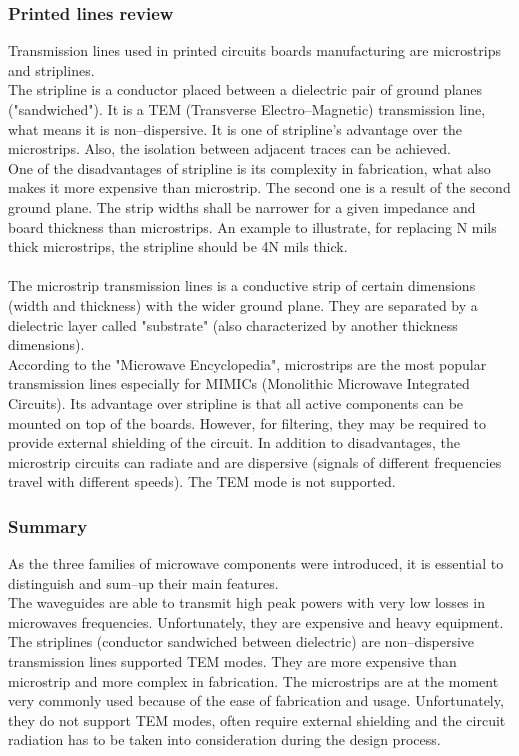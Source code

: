 \documentclass[eng,printmode]{mgr}
\begin{document}
\subsubsection{Printed lines review}
Transmission lines used in printed circuits boards manufacturing are microstrips and striplines.\\
The stripline is a conductor placed between a dielectric pair of ground planes ("sandwiched"). It is a TEM (Transverse Electro--Magnetic) transmission line, what means it is non--dispersive. It is one of stripline's advantage over the microstrips. Also, the isolation between adjacent traces can be achieved.\\
One of the disadvantages of stripline is its complexity in fabrication, what also makes it more expensive than microstrip. The second one is a result of the second ground plane. The strip widths shall be narrower for a given impedance and board thickness than microstrips. 
An example to illustrate, for replacing N mils thick microstrips, the stripline should be 4N mils thick.
\\
\\
The microstrip transmission lines is a conductive strip of certain dimensions (width and thickness) with the wider ground plane. They are separated by a dielectric layer called "substrate" (also characterized by another thickness dimensions). \\According to the "Microwave Encyclopedia", microstrips are the most popular transmission lines especially for MIMICs (Monolithic Microwave Integrated Circuits).
Its advantage over stripline is that all active components can be mounted on top of the boards. However, for filtering, they may be required to provide external shielding of the circuit. In addition to disadvantages, the microstrip circuits can radiate and are dispersive (signals of different frequencies travel with different speeds). The TEM mode is not supported.

\subsubsection{Summary}
As the three families of microwave components were introduced, it is essential to distinguish and sum--up their main features.\\
The waveguides are able to transmit high peak powers with very low losses in microwaves frequencies. Unfortunately, they are expensive and heavy equipment.
The striplines (conductor sandwiched between dielectric) are non--dispersive transmission lines supported TEM modes. They are more expensive than microstrip and more complex in fabrication.
The microstrips are at the moment very commonly used because of the ease of fabrication and usage. Unfortunately, they do not support TEM modes, often require external shielding and the circuit radiation has to be taken into consideration during the design process.
\end{document}
